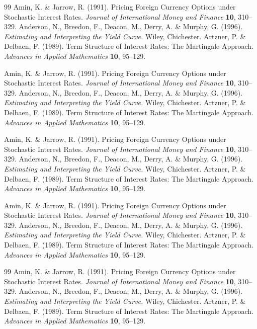\documentclass{Base}
\begin{document}
\begin{thenumbibliography}{99}
Amin, K. \& Jarrow, R.  (1991).  Pricing Foreign Currency Options
under Stochastic Interest Rates. {\em Journal of International
Money and Finance} {\bf 10}, 310--329.
%
Anderson, N., Breedon, F., Deacon, M., Derry, A. \& Murphy, G.
(1996). {\em Estimating and Interpreting the Yield Curve.} Wiley,
Chichester.
%
Artzner, P. \& Delbaen, F.  (1989). Term Structure of Interest
Rates: The Martingale Approach. {\em Advances in Applied
Mathematics} {\bf 10}, 95--129.

Amin, K. \& Jarrow, R.  (1991).  Pricing Foreign Currency Options
under Stochastic Interest Rates. {\em Journal of International
Money and Finance} {\bf 10}, 310--329.
%
Anderson, N., Breedon, F., Deacon, M., Derry, A. \& Murphy, G.
(1996). {\em Estimating and Interpreting the Yield Curve.} Wiley,
Chichester.
%
Artzner, P. \& Delbaen, F.  (1989). Term Structure of Interest
Rates: The Martingale Approach. {\em Advances in Applied
Mathematics} {\bf 10}, 95--129.


Amin, K. \& Jarrow, R.  (1991).  Pricing Foreign Currency Options under
Stochastic Interest Rates.
{\em Journal of International Money and Finance} {\bf 10}, 310--329.
%
Anderson, N., Breedon, F., Deacon, M., Derry, A. \& Murphy, G. (1996).
{\em Estimating and Interpreting the Yield Curve.} Wiley, Chichester.
%
Artzner, P. \& Delbaen, F.  (1989). Term Structure of Interest Rates: The Martingale Approach.
{\em Advances in Applied Mathematics} {\bf 10}, 95--129.

Amin, K. \& Jarrow, R.  (1991).  Pricing Foreign Currency Options
under Stochastic Interest Rates. {\em Journal of International
Money and Finance} {\bf 10}, 310--329.
%
Anderson, N., Breedon, F., Deacon, M., Derry, A. \& Murphy, G.
(1996). {\em Estimating and Interpreting the Yield Curve.} Wiley,
Chichester.
%
Artzner, P. \& Delbaen, F.  (1989). Term Structure of Interest
Rates: The Martingale Approach. {\em Advances in Applied
Mathematics} {\bf 10}, 95--129.

\end{thenumbibliography}

\begin{theunbibliography}{99}
Amin, K. \& Jarrow, R.  (1991).  Pricing Foreign Currency Options under
Stochastic Interest Rates.
{\em Journal of International Money and Finance} {\bf 10}, 310--329.
%
Anderson, N., Breedon, F., Deacon, M., Derry, A. \& Murphy, G. (1996).
{\em Estimating and Interpreting the Yield Curve.} Wiley, Chichester.
%
Artzner, P. \& Delbaen, F.  (1989). Term Structure of Interest Rates: The Martingale Approach.
{\em Advances in Applied Mathematics} {\bf 10}, 95--129.
\end{theunbibliography}
\end{document}
